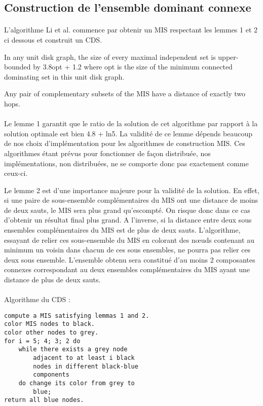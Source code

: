 \subsection{Construction de l'ensemble dominant connexe}
\paragraph{}
L'algorithme Li et al. commence par obtenir un MIS respectant les lemmes 1 et 2 ci dessous et construit un CDS.

\begin{lemma}
In any unit disk graph, the size of every
maximal independent set is upper-bounded by
3.8opt + 1.2 where opt is the size of the minimum
connected dominating set in this unit disk graph.
\end{lemma}
\begin{lemma}
Any pair of complementary subsets of the
MIS have a distance of exactly two hops.
\end{lemma}

\paragraph{}
Le lemme 1 garantit que le ratio de la solution de cet algorithme par rapport à la solution optimale est bien 4.8 + ln5. La validité de ce lemme dépends beaucoup de nos choix d'implémentation pour les algorithmes de construction MIS. Ces algorithmes étant prévus pour fonctionner de façon distribuée, nos implémentations, non distribuées, ne se comporte donc pas exactement comme ceux-ci.

Le lemme 2 est d'une importance majeure pour la validité de la solution. En effet, si une paire de sous-ensemble complémentaires du MIS ont une distance de moins de deux sauts, le MIS sera plus grand qu'escompté. On risque donc dans ce cas d'obtenir un résultat final plus grand.
A l'inverse, si la distance entre deux sous ensembles complémentaires du MIS est de plus de deux sauts. L'algorithme, essayant de relier ces sous-ensemble du MIS en colorant des nœuds contenant au minimum un voisin dans chacun de ces sous ensembles, ne pourra pas relier ces deux sous ensemble. L'ensemble obtenu sera constitué d'au moins 2 composantes connexes correspondant au deux ensembles complémentaires du MIS ayant une distance de plus de deux sauts.

\paragraph{}
Algorithme du CDS :
\begin{lstlisting}
compute a MIS satisfying lemmas 1 and 2.
color MIS nodes to black.
color other nodes to grey.
for i = 5; 4; 3; 2 do
	while there exists a grey node
		adjacent to at least i black
		nodes in different black-blue
		components
	do change its color from grey to
		blue;
return all blue nodes.
\end{lstlisting}

